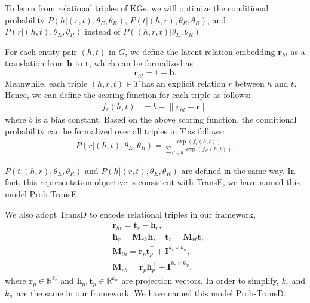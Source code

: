 \documentclass[letterpaper]{article} %
\begin{document}
To learn from relational triples of KGs, we will optimize the conditional probability $P(h|(r, t),{\theta_E, \theta_R})$, $P(t|(h, r),{\theta_E, \theta_R})$, and $P(r|(h, t),{\theta_E, \theta_R})$ instead of $P((h, r, t)|{\theta_E, \theta_R})$

For each entity pair $(h, t)$ in $G$, we define the latent relation embedding $\mathbf{r}_{ht}$ as a translation from $\mathbf{h}$ to $\mathbf{t}$, which can be formalized as
\begin{equation}
\textbf{r}_{ht} = \textbf{t} - \textbf{h}.
\end{equation}
Meanwhile, each triple $(h, r, t) \in T$ has an explicit relation $r$ between $h$ and $t$. Hence, we can define the scoring function for each triple as follows:
\begin{align}
\label{eq:kg_distance}
f_r(h, t) & = b - \lVert \textbf{r}_{ht} - \textbf{r} \rVert  
\end{align}
where $b$ is a bias constant. Based on the above scoring function, the conditional probability can be formalized over all triples in $T$ as follows:
\begin{align}
P(r|(h, t),{\theta_E, \theta_R}) = \frac{\exp(f_r(h, t))}{\sum_{{r'} \in R} \exp(f_{r'}(h, t))}.
\end{align}

$P(t|(h, r), {\theta_E, \theta_R})$ and $P(h|(r, t),{\theta_E, \theta_R})$ are defined in the same way. In fact, this representation objective is consistent with TransE, we have named this model Prob-TransE.

We also adopt TransD to encode relational triples in our framework, 
\begin{align}
&\textbf{r}_{ht} = \textbf{t}_{r} - \textbf{h}_{r}, \\
&\textbf{h}_{r}  = \textbf{M}_{rh}\textbf{h}, \quad \textbf{t}_{r} = \textbf{M}_{rt}\textbf{t}, \\\nonumber
&\textbf{M}_{th} = \textbf{r}_p\textbf{t}_p^{\top}+\textbf{I}^{k_r \times k_w},	\\\nonumber
&\textbf{M}_{rh} = \textbf{r}_p\textbf{h}_p^{\top}+\textbf{I}^{k_r \times k_w},	\nonumber
\end{align}
where $\textbf{r}_p \in \mathbb{R}^{k_r} $ and $\textbf{h}_p, \textbf{t}_p \in \mathbb{R}^{k_w}$ are projection vectors. In order to simplify, $k_r$ and $k_w$ are the same in our framework. We have named this model Prob-TransD.
\end{document}

